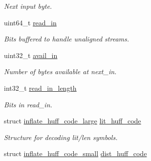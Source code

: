\begin{DoxyCompactItemize}
\begin{DoxyCompactList}\small\item\em Next input byte. \end{DoxyCompactList}\item 
\hypertarget{structinflate__state_a7b31d8a1e82de2e303c61d291e899e28}{uint64\-\_\-t \hyperlink{structinflate__state_a7b31d8a1e82de2e303c61d291e899e28}{read\-\_\-in}}\label{structinflate__state_a7b31d8a1e82de2e303c61d291e899e28}

\begin{DoxyCompactList}\small\item\em Bits buffered to handle unaligned streams. \end{DoxyCompactList}\item 
\hypertarget{structinflate__state_a93274af406747bdd3f94b5546a67bd07}{uint32\-\_\-t \hyperlink{structinflate__state_a93274af406747bdd3f94b5546a67bd07}{avail\-\_\-in}}\label{structinflate__state_a93274af406747bdd3f94b5546a67bd07}

\begin{DoxyCompactList}\small\item\em Number of bytes available at next\-\_\-in. \end{DoxyCompactList}\item 
\hypertarget{structinflate__state_a20599afa006cb6544d3d6ade67b67c62}{int32\-\_\-t \hyperlink{structinflate__state_a20599afa006cb6544d3d6ade67b67c62}{read\-\_\-in\-\_\-length}}\label{structinflate__state_a20599afa006cb6544d3d6ade67b67c62}

\begin{DoxyCompactList}\small\item\em Bits in read\-\_\-in. \end{DoxyCompactList}\item 
\hypertarget{structinflate__state_ac582f8f6e53188b366260c7f38931731}{struct \hyperlink{structinflate__huff__code__large}{inflate\-\_\-huff\-\_\-code\-\_\-large} \hyperlink{structinflate__state_ac582f8f6e53188b366260c7f38931731}{lit\-\_\-huff\-\_\-code}}\label{structinflate__state_ac582f8f6e53188b366260c7f38931731}

\begin{DoxyCompactList}\small\item\em Structure for decoding lit/len symbols. \end{DoxyCompactList}\item 
\hypertarget{structinflate__state_ae8f5da00291599b6f19c4a145d8b5738}{struct \hyperlink{structinflate__huff__code__small}{inflate\-\_\-huff\-\_\-code\-\_\-small} \hyperlink{structinflate__state_ae8f5da00291599b6f19c4a145d8b5738}{dist\-\_\-huff\-\_\-code}}\label{structinflate__state_ae8f5da00291599b6f19c4a145d8b5738}


\end{DoxyCompactItemize}
